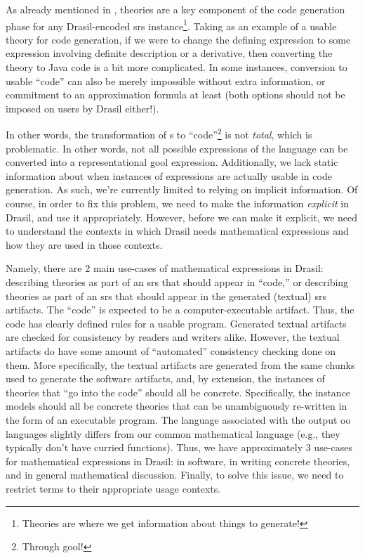 \pseudoExampleExpression{}

As already mentioned in , theories are a key component of
the code generation phase for any Drasil-encoded \acs{srs}
instance\footnote{Theories are where we get information about things to
generate!}. Taking  as an example of a usable theory for
code generation, if we were to change the defining expression to some expression
involving definite description or a derivative, then converting the theory to
Java code is a bit more complicated. In some instances, conversion to usable
``code'' can also be merely impossible without extra information, or commitment
to an approximation formula at least (both options should not be imposed on
users by Drasil either!).

In other words, the transformation of \Expr{}s to ``code''\footnote{Through
\acs{gool}!} is not \textit{total}, which is problematic. In other words, not
all possible expressions of the \Expr{} language can be converted into a
representational \acs{gool} expression. Additionally, we lack static information
about when instances of expressions are actually usable in code generation. As
such, we're currently limited to relying on implicit information. Of course, in
order to fix this problem, we need to make the information \textit{explicit} in
Drasil, and use it appropriately. However, before we can make it explicit, we
need to understand the contexts in which Drasil needs mathematical expressions
and how they are used in those contexts.

Namely, there are 2 main use-cases of mathematical expressions in Drasil:
describing theories as part of an \acs{srs} that should appear in ``code,'' or
describing theories as part of an \acs{srs} that should appear in the generated
(textual) \acs{srs} artifacts. The ``code'' is expected to be a
computer-executable artifact. Thus, the code has clearly defined rules for a
usable program. Generated textual artifacts are checked for consistency by
readers and writers alike. However, the textual artifacts do have some amount of
``automated'' consistency checking done on them. More specifically, the textual
artifacts are generated from the same chunks used to generate the software
artifacts, and, by extension, the instances of theories that ``go into the
code'' should all be concrete. Specifically, the instance models should all be
concrete theories that can be unambiguously re-written in the form of an
executable program. The language associated with the output \acs{oo} languages
slightly differs from our common mathematical language (e.g., they typically
don't have curried functions). Thus, we have approximately 3 use-cases for
mathematical expressions in Drasil: in software, in writing concrete theories,
and in general mathematical discussion. Finally, to solve this issue, we need to
restrict terms to their appropriate usage contexts.

